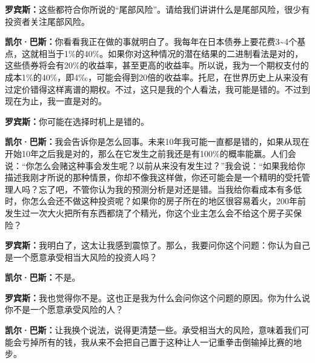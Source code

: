 \begin{BookQuote}
\textbf{罗宾斯：}这些都符合你所说的“尾部风险”。请给我们讲讲什么是尾部风险，很少有投资者关注尾部风险。
\end{BookQuote}

\begin{BookQuote}
\textbf{凯尔·巴斯：}你看看我正在做的事就明白了。我每年在日本债券上要花费3\textasciitilde{}4个基点，这就相当于1\%的40\%。如果你对这种情况的潜在结果的二进制看法是对的，这些债券将会有20\%的收益率，甚至更高的收益率。所以说，我为一个期权支付的成本1\%的40\%，即4‰，可能会得到20倍的收益率。托尼，在世界历史上从来没有过定价错得这样离谱的期权。不过，这只是我的个人看法，我可能是错的。不过到现在为止，我一直是对的。
\end{BookQuote}

\begin{BookQuote}
\textbf{罗宾斯：}你可能在选择时机上是错的。
\end{BookQuote}

\begin{BookQuote}
\textbf{凯尔·巴斯：}我会告诉你是怎么回事。未来10年我可能一直都是错的，如果从现在开始10年之后我是对的，那么在它发生之前我还是有100\%的概率能赢。人们会说：“你怎么会赌这种事会发生呢？以前从来没有发生过？”我会说：“如果我给你描述我刚才所说的那种情景，你却不像我这样做，你还可能会是一个精明的受托管理人吗？忘了吧，不管你认为我的预测分析是对还是错。当我给你看成本有多低时，你怎么会还不做这种投资呢？如果你的房子所在的地区很容易着火，200年前发生过一次大火把所有东西都烧了个精光，你这个业主怎么会不给这个房子买保险？
\end{BookQuote}

\begin{BookQuote}
\textbf{罗宾斯：}我明白了，这太让我感到震惊了。那么，我要问你这个问题：你认为自己是一个愿意承受相当大风险的投资人吗？
\end{BookQuote}

\begin{BookQuote}
\textbf{凯尔·巴斯：}不是。
\end{BookQuote}

\begin{BookQuote}
\textbf{罗宾斯：}我也觉得你不是。这也正是我为什么会问你这个问题的原因。你为什么说你不是一个愿意承受风险的人？
\end{BookQuote}

\begin{BookQuote}
\textbf{凯尔·巴斯：}让我换个说法，说得更清楚一些。承受相当大的风险，意味着我们可能会亏掉所有的钱，我从来不会把自己置于这种让人一记重拳击倒输掉比赛的地步。
\end{BookQuote}

